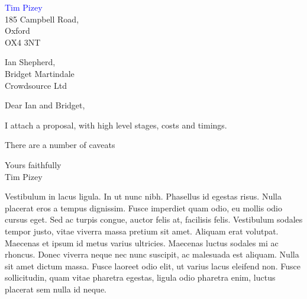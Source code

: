 \documentclass[12pt, a4paper]{article}
\newcommand{\fromName}{Tim Pizey}
\newcommand{\toName}{Ian  Shepherd, \\ Bridget Martindale}
\newcommand{\toAddress}{Crowdsource Ltd}
\newcommand{\fromAddress}{
\vspace{10 mm}
\hfill \textcolor{blue}{\Large \fromName} \\
\hspace*{0pt} \hfill 185 Campbell Road, \\
\hspace*{0pt} \hfill Oxford \\
\hspace*{0pt} \hfill  OX4 3NT
}
\begin{document}
\sffamily
\setlength\parindent{24pt}
\thispagestyle{plain}

\fromAddress

\noindent \toName \\ 
\noindent \toAddress


\vspace{10 mm}

\noindent Dear  Ian and Bridget, 
\vspace{7mm}

I attach a proposal, with high level stages, costs and timings. 

There are a number of caveats



 
\vspace{10 mm}
\setlength\parindent{33mm}
{\indent Yours faithfully}
\vspace{26 mm}\\
\setlength\parindent{36mm}
{\indent \fromName}
\setlength\parindent{24pt}



\newpage

{\color{red}Vestibulum in lacus ligula. In ut nunc nibh. Phasellus id egestas risus. Nulla placerat eros a tempus dignissim. Fusce imperdiet quam odio, eu mollis odio cursus eget. Sed ac turpis congue, auctor felis at, facilisis felis. Vestibulum sodales tempor justo, vitae viverra massa pretium sit amet. Aliquam erat volutpat. Maecenas et ipsum id metus varius ultricies. Maecenas luctus sodales mi ac rhoncus. Donec viverra neque nec nunc suscipit, ac malesuada est aliquam. Nulla sit amet dictum massa. Fusce laoreet odio elit, ut varius lacus eleifend non. Fusce sollicitudin, quam vitae pharetra egestas, ligula odio pharetra enim, luctus placerat sem nulla id neque.

}
 
 
 
\end{document}
